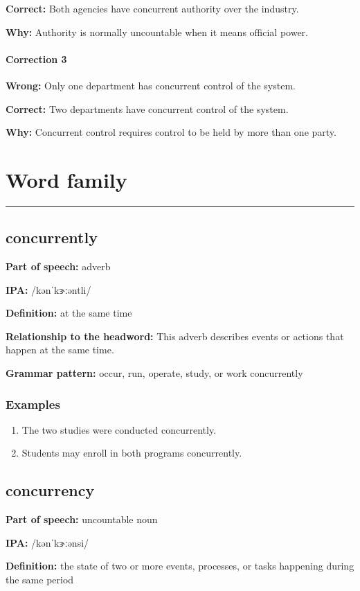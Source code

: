 \documentclass[11pt]{article}
\newcommand{\sectionrule}{\par\vspace{-0.5em}\noindent\textcolor{Accent}{\rule{\linewidth}{0.6pt}}\par}
\begin{document}
\textbf{Correct:} Both agencies have concurrent authority over the industry.

\textbf{Why:} Authority is normally uncountable when it means official power.

\paragraph{Correction 3}
\textbf{Wrong:} Only one department has concurrent control of the system.

\textbf{Correct:} Two departments have concurrent control of the system.

\textbf{Why:} Concurrent control requires control to be held by more than one party.

\section{Word family}
\sectionrule
\subsection{concurrently}
\textbf{Part of speech:} adverb

\textbf{IPA:} /kənˈkɝːəntli/

\textbf{Definition:} at the same time

\textbf{Relationship to the headword:} This adverb describes events or actions that happen at the same time.

\textbf{Grammar pattern:} occur, run, operate, study, or work concurrently

\subsubsection{Examples}
\begin{enumerate}
  \item The two studies were conducted concurrently.
  \item Students may enroll in both programs concurrently.
\end{enumerate}

\subsection{concurrency}
\textbf{Part of speech:} uncountable noun

\textbf{IPA:} /kənˈkɝːənsi/

\textbf{Definition:} the state of two or more events, processes, or tasks happening during the same period
\end{document}
